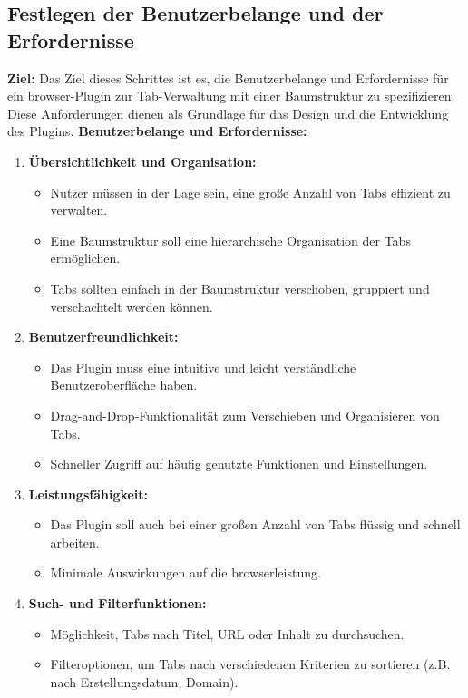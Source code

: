 \subsection{Festlegen der Benutzerbelange und der Erfordernisse}

\textbf{Ziel:} Das Ziel dieses Schrittes ist es, die Benutzerbelange und Erfordernisse für ein \gls{browser}-Plugin zur Tab-Verwaltung mit einer Baumstruktur zu spezifizieren. Diese Anforderungen dienen als Grundlage für das Design und die Entwicklung des Plugins.
\textbf{Benutzerbelange und Erfordernisse:}

\begin{enumerate}
    \item \textbf{Übersichtlichkeit und Organisation:}
    \begin{itemize}
        \item Nutzer müssen in der Lage sein, eine große Anzahl von Tabs effizient zu verwalten.
        \item Eine Baumstruktur soll eine hierarchische Organisation der Tabs ermöglichen.
        \item Tabs sollten einfach in der Baumstruktur verschoben, gruppiert und verschachtelt werden können.
    \end{itemize}
    
    \item \textbf{Benutzerfreundlichkeit:}
    \begin{itemize}
        \item Das Plugin muss eine intuitive und leicht verständliche Benutzeroberfläche haben.
        \item Drag-and-Drop-Funktionalität zum Verschieben und Organisieren von Tabs.
        \item Schneller Zugriff auf häufig genutzte Funktionen und Einstellungen.
    \end{itemize}
    
    \item \textbf{Leistungsfähigkeit:}
    \begin{itemize}
        \item Das Plugin soll auch bei einer großen Anzahl von Tabs flüssig und schnell arbeiten.
        \item Minimale Auswirkungen auf die \gls{browser}leistung.
    \end{itemize}
    
    \item \textbf{Such- und Filterfunktionen:}
    \begin{itemize}
        \item Möglichkeit, Tabs nach Titel, URL oder Inhalt zu durchsuchen.
        \item Filteroptionen, um Tabs nach verschiedenen Kriterien zu sortieren (z.B. nach Erstellungsdatum, Domain).
    \end{itemize}
    

\end{enumerate}
